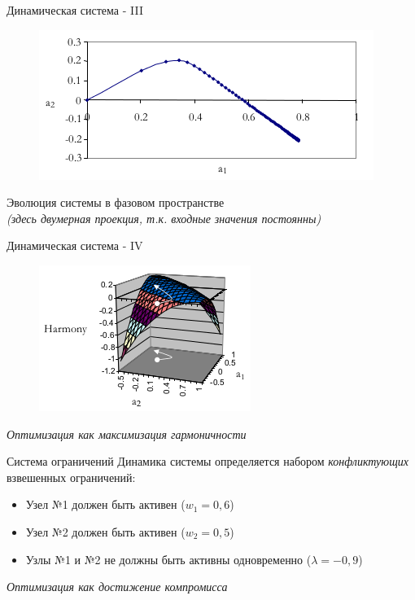 \documentclass{beamer}
\begin{document}
\begin{frame}{Динамическая система - III}
\begin{center}
	\begin{figure}[H]
		\includegraphics[scale=0.7]{harmonic3.png} 
	\end{figure}
\end{center}
\bigskip
Эволюция системы в фазовом пространстве\\
\textit{(здесь двумерная проекция, т.к. входные значения постоянны)}
\end{frame}

\begin{frame}{Динамическая система - IV}
\begin{center}
	\begin{figure}[H]
		\includegraphics[scale=0.8]{harmonic4.png} 
	\end{figure}
\end{center}
\bigskip
\textit{Оптимизация как максимизация гармоничности}
\end{frame}

\begin{frame}{Система ограничений}
Динамика системы определяется набором \textit{конфликтующих} взвешенных ограничений:\\
\medskip
\begin{itemize}
	\item Узел №1 должен быть активен ($w_1 = 0,6$)
	\medskip
	\item Узел №2 должен быть активен ($w_2 = 0,5$)
	\medskip
	\item Узлы №1 и №2 не должны быть активны одновременно ($\lambda = -0,9$)
\end{itemize}
\bigskip
\textit{Оптимизация как достижение компромисса}
\end{frame}
\end{document}
